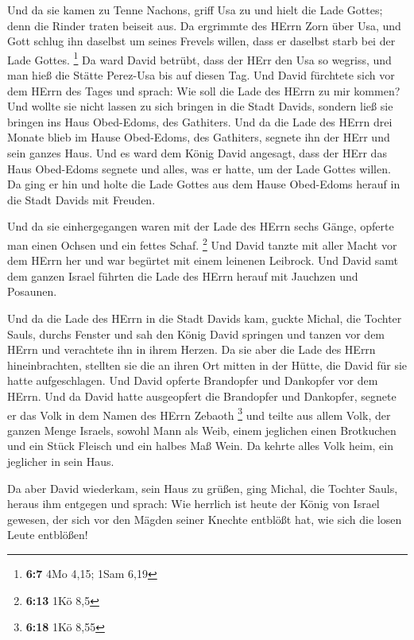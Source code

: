  Und da sie kamen zu Tenne Nachons, griff Usa zu und hielt
die Lade Gottes; denn die Rinder traten beiseit aus.  Da
ergrimmte des HErrn Zorn über Usa, und Gott schlug ihn daselbst um
seines Frevels willen, dass er daselbst starb bei der Lade Gottes.
\footnote{\textbf{6:7} 4Mo 4,15; 1Sam 6,19}  Da ward David
betrübt, dass der HErr den Usa so wegriss, und man hieß die Stätte
Perez-Usa bis auf diesen Tag.  Und David fürchtete sich vor
dem HErrn des Tages und sprach: Wie soll die Lade des HErrn zu mir
kommen?  Und wollte sie nicht lassen zu sich bringen in die
Stadt Davids, sondern ließ sie bringen ins Haus Obed-Edoms, des
Gathiters.  Und da die Lade des HErrn drei Monate blieb im
Hause Obed-Edoms, des Gathiters, segnete ihn der HErr und sein ganzes
Haus.  Und es ward dem König David angesagt, dass der HErr
das Haus Obed-Edoms segnete und alles, was er hatte, um der Lade Gottes
willen. Da ging er hin und holte die Lade Gottes aus dem Hause
Obed-Edoms herauf in die Stadt Davids mit Freuden.

 Und da sie einhergegangen waren mit der Lade des HErrn
sechs Gänge, opferte man einen Ochsen und ein fettes Schaf. \footnote{\textbf{6:13}
  1Kö 8,5}  Und David tanzte mit aller Macht vor dem HErrn
her und war begürtet mit einem leinenen Leibrock.  Und
David samt dem ganzen Israel führten die Lade des HErrn herauf mit
Jauchzen und Posaunen.

 Und da die Lade des HErrn in die Stadt Davids kam, guckte
Michal, die Tochter Sauls, durchs Fenster und sah den König David
springen und tanzen vor dem HErrn und verachtete ihn in ihrem Herzen.
 Da sie aber die Lade des HErrn hineinbrachten, stellten
sie die an ihren Ort mitten in der Hütte, die David für sie hatte
aufgeschlagen. Und David opferte Brandopfer und Dankopfer vor dem HErrn.
 Und da David hatte ausgeopfert die Brandopfer und
Dankopfer, segnete er das Volk in dem Namen des HErrn Zebaoth
\footnote{\textbf{6:18} 1Kö 8,55}  und teilte aus allem
Volk, der ganzen Menge Israels, sowohl Mann als Weib, einem jeglichen
einen Brotkuchen und ein Stück Fleisch und ein halbes Maß Wein. Da
kehrte alles Volk heim, ein jeglicher in sein Haus.

 Da aber David wiederkam, sein Haus zu grüßen, ging Michal,
die Tochter Sauls, heraus ihm entgegen und sprach: Wie herrlich ist
heute der König von Israel gewesen, der sich vor den Mägden seiner
Knechte entblößt hat, wie sich die losen Leute entblößen!

